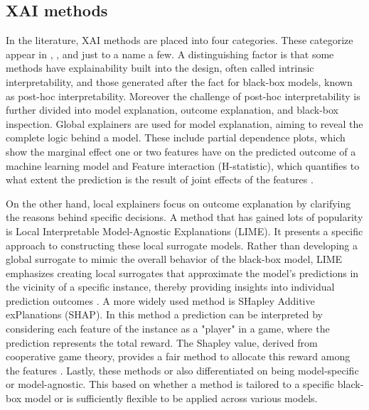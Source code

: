 \subsection{XAI methods}
In the literature, XAI methods are placed into four categories. These categorize appear in \citet{guidotti2018survey}, \citet{arrieta2020explainable}, and \citet{samek2019explainable} just to a name a few. A distinguishing factor is that some methods have explainability built into the design, often called intrinsic interpretability, and those generated after the fact for black-box models, known as post-hoc interpretability. Moreover the challenge of post-hoc interpretability is further divided into model explanation, outcome explanation, and black-box inspection. Global explainers are used for model explanation, aiming to reveal the complete logic behind a model. These include partial dependence plots, which show the marginal effect one or two features have on the predicted outcome of a machine learning model \citep{friedman2001greedy} and Feature interaction (H-statistic), which quantifies to what extent the prediction is the result of joint effects of the features \citep{friedman2008predictive}. 

On the other hand, local explainers focus on outcome explanation by clarifying the reasons behind specific decisions. A method that has gained lots of popularity is Local Interpretable Model-Agnostic Explanations (LIME). It presents a specific approach to constructing these local surrogate models. Rather than developing a global surrogate to mimic the overall behavior of the black-box model, LIME emphasizes creating local surrogates that approximate the model's predictions in the vicinity of a specific instance, thereby providing insights into individual prediction outcomes \citep{ribeiro2016should}. A more widely used method is SHapley Additive exPlanations (SHAP). In this method a prediction can be interpreted by considering each feature of the instance as a "player" in a game, where the prediction represents the total reward. The Shapley value, derived from cooperative game theory, provides a fair method to allocate this reward among the features \citep{lundberg2017unified}. Lastly, these methods or also differentiated on being model-specific or model-agnostic. This based on whether a method is tailored to a specific black-box model or is sufficiently flexible to be applied across various models.

